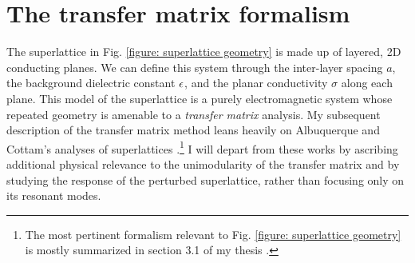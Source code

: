 \section{The transfer matrix formalism}

The superlattice in Fig. \ref{figure: superlattice geometry} is made up of layered, 2D conducting planes.  We can define this system through the inter-layer spacing $a$, the background dielectric constant $\epsilon$, and the planar conductivity $\sigma$ along each plane.  This model of the superlattice is a purely electromagnetic system whose repeated geometry is amenable to a {\it transfer matrix} analysis.  My subsequent description of the transfer matrix method leans heavily on Albuquerque and Cottam's analyses of superlattices \cite{Cottam1993,Cottam2004}.\footnote{The most pertinent formalism relevant to Fig. \ref{figure: superlattice geometry} is mostly summarized in section 3.1 of my thesis \cite{Boyd2021}.}  I will depart from these works by ascribing additional physical relevance to the unimodularity of the transfer matrix and by studying the response of the perturbed superlattice, rather than focusing only on its resonant modes.


